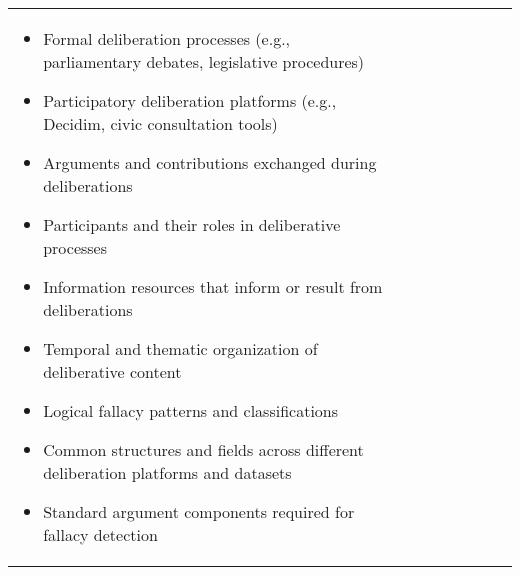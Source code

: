 \documentclass[11pt,a4paper]{article}
\begin{document}
\begin{table}
\begin{tabular}{| l | l | l | l  | l | l | l |l| }
{\begin{itemize}
\item Formal deliberation processes (e.g., parliamentary debates, legislative procedures)
\item Participatory deliberation platforms (e.g., Decidim, civic consultation tools)
\item Arguments and contributions exchanged during deliberations
\item Participants and their roles in deliberative processes
\item Information resources that inform or result from deliberations
\item Temporal and thematic organization of deliberative content
\item Logical fallacy patterns and classifications
\item Common structures and fields across different deliberation platforms and datasets
\item Standard argument components required for fallacy detection
\end{itemize}

}
\end{tabular}
\end{table}
\end{document}
